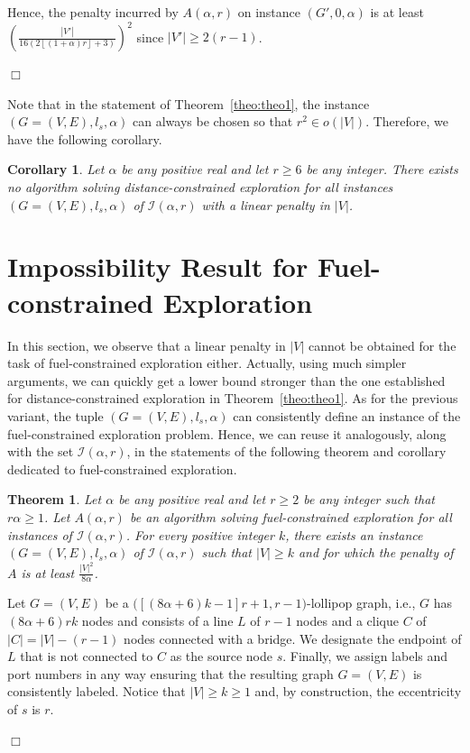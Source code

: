 \documentclass[11pt]{article}
\newtheorem{theorem}{Theorem}[section]
\newtheorem{corollary}{Corollary}[section]
\newcommand{\qed}{\hfill $\Box$ \bigbreak}
\newenvironment{proof}{\noindent {\bf Proof.}}{\qed}
\begin{document}
{\begin{proof}
Hence, the penalty incurred by $A(\alpha, r)$ on instance $(G', 0, \alpha)$ is at least
$\left(\frac{|V'|}{16\left(2\left\lfloor(1+\alpha)r\right\rfloor+3\right)}\right)^2$ since $|V'|\geq 2(r-1)$.

\end{proof}

Note that in the statement of Theorem~\ref{theo:theo1}, the instance $(G=(V, E), l_s, \alpha)$ can always be chosen so that $r^2\in o(|V|)$. Therefore, we have the following corollary.

\begin{corollary}
\label{col:col1}
Let $\alpha$ be any positive real and let $r\geq 6$ be any integer. There exists no algorithm solving distance-constrained exploration for all instances $(G=(V,E),l_s,\alpha)$ of $\mathcal{I}(\alpha,r)$ with a linear penalty in $|V|$.
\end{corollary}

\section{Impossibility Result for Fuel-constrained Exploration}

In this section, we observe that a linear penalty in $|V|$ cannot be obtained for the task of fuel-constrained exploration either. Actually, using much simpler arguments, we can quickly get a lower bound stronger than the one established for distance-constrained exploration in Theorem~\ref{theo:theo1}. As for the previous variant, the tuple $(G=(V,E),l_s,\alpha)$ can consistently define an instance of the fuel-constrained exploration problem. Hence, we can reuse it analogously, along with the set $\mathcal{I}(\alpha,r)$, in the statements of the following theorem and corollary dedicated to fuel-constrained exploration.

\begin{theorem}
\label{theo:theo2}
Let $\alpha$ be any positive real and let $r\geq 2$ be any integer such that $r\alpha\geq 1$. Let $A(\alpha,r)$ be an algorithm solving fuel-constrained exploration for all instances of $\mathcal{I}(\alpha,r)$. For every positive integer $k$, there exists an instance $(G=(V,E),l_s,\alpha)$ of $\mathcal{I}(\alpha,r)$ such that $|V|\geq k$ and for which the penalty of $A$ is at least $\frac{|V|^2}{8\alpha}$.
\end{theorem}

\begin{proof}
  Let $G=(V,E)$ be a $\Big([(8\alpha+6)k-1]r+1,r-1\Big)$-lollipop
  graph, i.e., $G$ has $(8\alpha+6)rk$ nodes and consists of a line
  $L$ of $r-1$ nodes and a clique $C$ of $|C| = |V| - (r-1)$ nodes
  connected with a bridge. We designate the endpoint of $L$ that is
  not connected to $C$ as the source node $s$. Finally, we assign
  labels and port numbers in any way ensuring that the resulting graph
  $G=(V,E)$ is consistently labeled. Notice that $|V| \geq k \geq 1$
  and, by construction, the eccentricity of $s$ is $r$.


\end{proof}}
\end{document}
